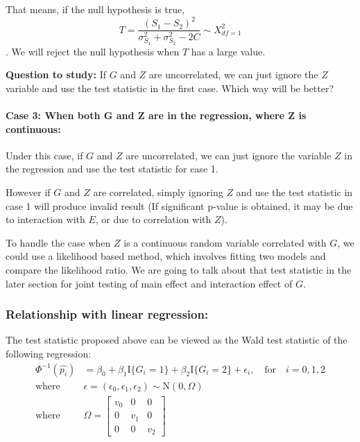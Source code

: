 \documentclass[]{article}
\let\oldparagraph\paragraph
\renewcommand{\paragraph}[1]{\oldparagraph{#1}\mbox{}}
\begin{document}
That means, if the null hypothesis is true,
\[ T = \frac{(S_1-S_2)^2}{\sigma_{S_1}^2+\sigma_{S_2}^2 -2C} \sim X^2_{df=1}\].
We will reject the null hypothesis when \(T\) has a large value.

\textbf{Question to study:} If \(G\) and \(Z\) are uncorrelated, we can
just ignore the \(Z\) variable and use the test statistic in the first
case. Which way will be better?

\hypertarget{case-3-when-both-g-and-z-are-in-the-regression-where-z-is-continuous}{%
\paragraph{Case 3: When both G and Z are in the regression, where Z is
continuous:}\label{case-3-when-both-g-and-z-are-in-the-regression-where-z-is-continuous}}

Under this case, if \(G\) and \(Z\) are uncorrelated, we can just ignore
the variable \(Z\) in the regression and use the test statistic for case
1.

However if \(G\) and \(Z\) are correlated, simply ignoring \(Z\) and use
the test statistic in case 1 will produce invalid result (If significant
p-value is obtained, it may be due to interaction with \(E\), or due to
correlation with \(Z\)).

To handle the case when \(Z\) is a continuous random variable correlated
with \(G\), we could use a likelihood based method, which involves
fitting two models and compare the likelihood ratio. We are going to
talk about that test statistic in the later section for joint testing of
main effect and interaction effect of \(G\).

\hypertarget{relationship-with-linear-regression}{%
\subsubsection{Relationship with linear
regression:}\label{relationship-with-linear-regression}}

The test statistic proposed above can be viewed as the Wald test
statistic of the following regression:
\begin{equation}\label{eqn:asWaldTest}
\begin{aligned}
\Phi^{-1}(\hat{p_{i}}) &= \beta_0 + \beta_1 \text{I}\{G_i = 1\} + \beta_2 \text{I}\{G_i = 2\} + \epsilon_i,\quad \text{for} \quad i = 0,1,2 \\
\text{where} \quad &\epsilon = (\epsilon_0, \epsilon_1, \epsilon_2) \sim \text{N}(0,\Omega) \\
\text{where} \quad &\Omega = \begin{bmatrix} v_0 & 0 & 0 \\ 0 & v_1 & 0 \\ 0 & 0 & v_2 \end{bmatrix}
\end{aligned}
\end{equation}
\end{document}
